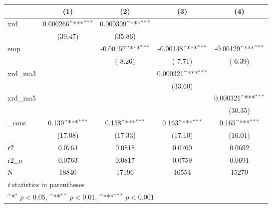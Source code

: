 {
\def\sym#1{\ifmmode^{#1}\else\(^{#1}\)\fi}
\begin{tabular}{l*{4}{c}}
\hline\hline
            &\multicolumn{1}{c}{(1)}         &\multicolumn{1}{c}{(2)}         &\multicolumn{1}{c}{(3)}         &\multicolumn{1}{c}{(4)}         \\
\hline
xrd         &    0.000266\sym{***}&    0.000309\sym{***}&                     &                     \\
            &     (39.47)         &     (35.86)         &                     &                     \\
[1em]
emp         &                     &    -0.00152\sym{***}&    -0.00148\sym{***}&    -0.00129\sym{***}\\
            &                     &     (-8.26)         &     (-7.71)         &     (-6.39)         \\
[1em]
xrd\_ma3     &                     &                     &    0.000321\sym{***}&                     \\
            &                     &                     &     (33.60)         &                     \\
[1em]
xrd\_ma5     &                     &                     &                     &    0.000321\sym{***}\\
            &                     &                     &                     &     (30.35)         \\
[1em]
\_cons      &       0.139\sym{***}&       0.158\sym{***}&       0.163\sym{***}&       0.165\sym{***}\\
            &     (17.08)         &     (17.33)         &     (17.10)         &     (16.01)         \\
\hline
r2          &      0.0764         &      0.0818         &      0.0760         &      0.0692         \\
r2\_a        &      0.0763         &      0.0817         &      0.0759         &      0.0691         \\
N           &       18840         &       17196         &       16554         &       15270         \\
\hline\hline
\multicolumn{5}{l}{\footnotesize \textit{t} statistics in parentheses}\\
\multicolumn{5}{l}{\footnotesize \sym{*} \(p<0.05\), \sym{**} \(p<0.01\), \sym{***} \(p<0.001\)}\\
\end{tabular}
}
